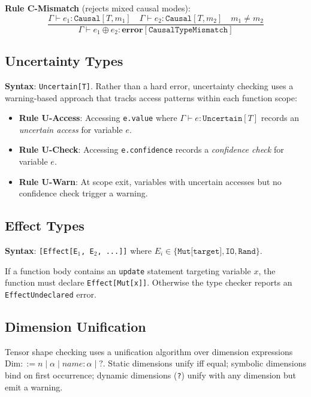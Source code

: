 \documentclass[11pt,a4paper]{article}
\newcommand{\ty}[1]{\texttt{#1}}
\begin{document}
\textbf{Rule C-Mismatch} (rejects mixed causal modes):
\begin{equation}
\frac{\Gamma \vdash e_1 : \ty{Causal}[T, m_1] \quad \Gamma \vdash e_2 : \ty{Causal}[T, m_2] \quad m_1 \neq m_2}{\Gamma \vdash e_1 \oplus e_2 : \textbf{error}[\ty{CausalTypeMismatch}]}
\end{equation}

\subsection{Uncertainty Types}
\label{sec:uncertainty}

\textbf{Syntax}: \ty{Uncertain[T]}. Rather than a hard error, uncertainty checking uses a warning-based approach that tracks access patterns within each function scope:

\begin{itemize}[itemsep=2pt]
  \item \textbf{Rule U-Access}: Accessing \ty{e.value} where $\Gamma \vdash e : \ty{Uncertain}[T]$ records an \emph{uncertain access} for variable $e$.
  \item \textbf{Rule U-Check}: Accessing \ty{e.confidence} records a \emph{confidence check} for variable $e$.
  \item \textbf{Rule U-Warn}: At scope exit, variables with uncertain accesses but no confidence check trigger a warning.
\end{itemize}

\subsection{Effect Types}
\label{sec:effects}

\textbf{Syntax}: \ty{[Effect[E$_1$, E$_2$, ...]]} where $E_i \in \{\ty{Mut[target]}, \ty{IO}, \ty{Rand}\}$.

If a function body contains an \ty{update} statement targeting variable $x$, the function must declare \ty{Effect[Mut[x]]}. Otherwise the type checker reports an \ty{EffectUndeclared} error.

\subsection{Dimension Unification}

Tensor shape checking uses a unification algorithm over dimension expressions $\text{Dim} ::= n \mid \alpha \mid \textit{name}{:}\alpha \mid \texttt{?}$. Static dimensions unify iff equal; symbolic dimensions bind on first occurrence; dynamic dimensions (\texttt{?}) unify with any dimension but emit a warning.
\end{document}
